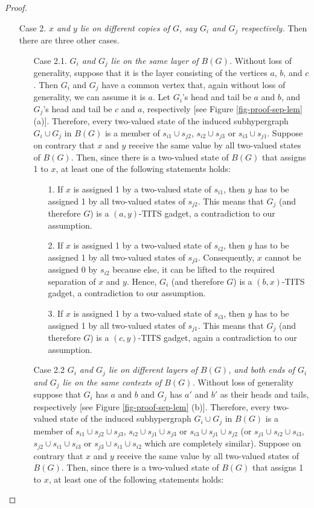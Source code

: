 \documentclass[%
12pt,
prereprint,
showpacs,
showkeys,
preprintnumbers,
amsmath,amssymb,
aps,
pra,
longbibliography,
notitlepage
]{revtex4-1}
\theoremstyle{definition}
\begin{document}
\begin{proof}
\begin{itemize}
			
			\item[Case 2.] \emph{$x$ and $y$ lie on different copies of $G$, say $G_i$ and $G_j$ respectively.} Then there are three other cases.
			\begin{itemize}
				\item[Case 2.1.] \emph{$G_i$ and $G_j$ lie on the same layer of $B(G)$.} Without loss of generality, suppose that it is the layer consisting of the vertices $a$, $b$, and $c$. Then $G_i$ and $G_j$ have a common vertex that, again without loss of generality, we can assume it is $a$. Let $G_i$'s head and tail be $a$ and $b$, and $G_j$'s head and tail be $c$ and $a$, respectively [see Figure \ref{fig-proof-sep-lem} (a)]. Therefore, every two-valued state of the induced subhypergraph $G_i \cup G_j$ in $B(G)$ is a member of $s_{i1} \cup s_{j2}$, $s_{i2} \cup s_{j3}$ or $s_{i3}\cup s_{j1}$. Suppose on contrary that $x$ and $y$ receive the same value by all two-valued states of $B(G)$. Then, since there is a two-valued state of $B(G)$ that assigns 1 to $x$, at least one of the following statements holds:
				
				\begin{itemize}
					\item[1.] If $x$ is assigned 1 by a two-valued state of $s_{i1}$, then $y$ has to be assigned 1 by all two-valued states of $s_{j2}$. This means that $G_j$ (and therefore $G$) is a $(a,y)$-TITS gadget, a contradiction to our assumption.
					\item[2.] If $x$ is assigned 1 by a two-valued state of $s_{i2}$, then $y$ has to be assigned 1 by all two-valued states of $s_{j3}$. Consequently, $x$ cannot be assigned 0 by $s_{i2}$ because else, it can be lifted to the required separation of $x$ and $y$. Hence, $G_i$ (and therefore $G$) is a $(b,x)$-TITS gadget, a contradiction to our assumption.
					\item[3.] If $x$ is assigned 1 by a two-valued state of $s_{i3}$, then $y$ has to be assigned 1 by all two-valued states of $s_{j1}$. This means that $G_j$ (and therefore $G$) is a $(c,y)$-TITS gadget, again a contradiction to our assumption.
				\end{itemize}
				
				
				\item[Case 2.2] \emph{$G_i$ and $G_j$ lie on different layers of $B(G)$, and both ends of $G_i$ and $G_j$ lie on the same contexts of $B(G)$.} Without loss of generality suppose that $G_i$ has $a$ and $b$ and $G_j$ has $a'$ and $b'$ as their heads and tails, respectively [see Figure \ref{fig-proof-sep-lem} (b)]. Therefore, every two-valued state of the induced subhypergraph $G_i \cup G_j$ in $B(G)$ is a member of $s_{i1} \cup s_{j2}\cup s_{j3}$, $s_{i2} \cup s_{j1}\cup s_{j3}$ or $s_{i3}\cup s_{j1}\cup s_{j2}$ (or $s_{j1} \cup s_{i2}\cup s_{i3}$, $s_{j2} \cup s_{i1}\cup s_{i3}$ or $s_{j3}\cup s_{i1}\cup s_{i2}$ which are completely similar). Suppose on contrary that $x$ and $y$ receive the same value by all two-valued states of $B(G)$. Then, since there is a two-valued state of $B(G)$ that assigns 1 to $x$, at least one of the following statements holds:
				

\end{itemize}
\end{itemize}
\end{proof}
\end{document}
